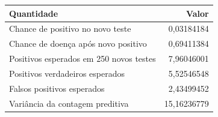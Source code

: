 \begin{tabular}{lr}
\toprule
Quantidade & Valor \\
\midrule
Chance de positivo no novo teste & 0,03184184 \\
Chance de doença após novo positivo & 0,69411384 \\
Positivos esperados em 250 novos testes & 7,96046001 \\
Positivos verdadeiros esperados & 5,52546548 \\
Falsos positivos esperados & 2,43499452 \\
Variância da contagem preditiva & 15,16236779 \\
\bottomrule
\end{tabular}
